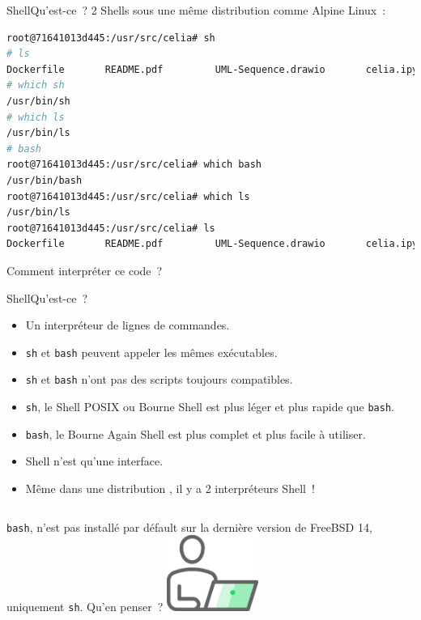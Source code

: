 \documentclass{beamer}
\begin{document}
    \begin{frame}[fragile]{Shell}{Qu'est-ce~?}
        2 Shells sous une même distribution  comme Alpine Linux~:
        \begin{lstlisting}[language=bash]
root@71641013d445:/usr/src/celia# sh
# ls
Dockerfile       README.pdf         UML-Sequence.drawio       celia.ipynb
# which sh
/usr/bin/sh
# which ls
/usr/bin/ls
# bash
root@71641013d445:/usr/src/celia# which bash
/usr/bin/bash
root@71641013d445:/usr/src/celia# which ls
/usr/bin/ls
root@71641013d445:/usr/src/celia# ls
Dockerfile       README.pdf         UML-Sequence.drawio       celia.ipynb
        \end{lstlisting}
        \bigbreak
        Comment interpréter ce code~?
    \end{frame}

    \begin{frame}{Shell}{Qu'est-ce~?}
        \begin{itemize}
            \item Un interpréteur de lignes de commandes.
            \item \lstinline{sh} et \lstinline{bash} peuvent appeler les mêmes exécutables.
            \item \lstinline{sh} et \lstinline{bash} n'ont pas des scripts toujours compatibles.
            \item \lstinline{sh}, le Shell POSIX ou Bourne Shell est plus léger et plus rapide que \lstinline{bash}.
            \item \lstinline{bash}, le Bourne Again Shell est plus complet et plus facile à utiliser.
            \item Shell n'est qu'une interface.
            \item Même dans une distribution , il y a 2 interpréteurs Shell~!
        \end{itemize}
        \begin{columns}
            \lstinline{bash}, n'est pas installé par défault sur la dernière version de FreeBSD 14, uniquement \lstinline{sh}.
            Qu'en penser~?
            \centering
            \includegraphics[width=3cm]{image/guy-in-front-of-desktop}
        \end{columns}
    \end{frame}
\end{document}

